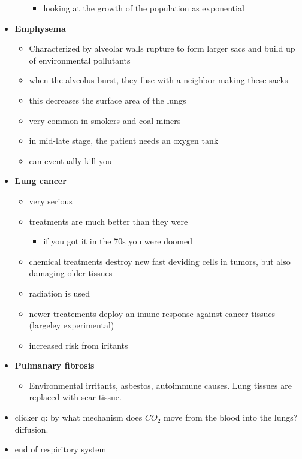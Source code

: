 \documentclass{article}
\theoremstyle{definition}
\begin{document}
\begin{itemize}
\begin{itemize}
\begin{itemize}
					\item looking at the growth of the population as exponential
				\end{itemize}
		\end{itemize}
	\item \textbf{Emphysema} 
		\begin{itemize}
			\item Characterized by alveolar walls rupture to form larger sacs and build up of environmental pollutants
			\item when the alveolus burst, they fuse with a neighbor making these sacks
			\item this decreases the surface area of the lungs
			\item very common in smokers and coal miners
			\item in mid-late stage, the patient needs an oxygen tank
			\item can eventually kill you
		\end{itemize}
	\item \textbf{Lung cancer} 
		\begin{itemize}
			\item very serious
			\item treatments are much better than they were
				\begin{itemize}
					\item if you got it in the 70s you were doomed
				\end{itemize}
			\item chemical treatments destroy new fast deviding cells in tumors, but also damaging older tissues
			\item radiation is used
			\item newer treatements deploy an imune response against cancer tissues (largeley experimental)
			\item increased risk from iritants
		\end{itemize}
	\item \textbf{Pulmanary fibrosis} 
		\begin{itemize}
			\item Environmental irritants, asbestos, autoimmune causes. Lung tissues are replaced with scar tissue.
		\end{itemize}
	\item clicker q: by what mechanism does $CO_2$ move from the blood into the lungs? diffusion.
	\item end of respiritory system
\end{itemize}
\end{document}
